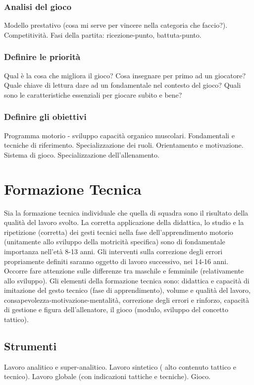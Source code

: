 \subsubsection{Analisi del gioco}
Modello prestativo (cosa mi serve per vincere nella categoria che faccio?).
Competitività.
Fasi della partita: ricezione-punto, battuta-punto.

\subsubsection{Definire le priorità}
Qual è la cosa che migliora il gioco? Cosa insegnare per primo ad un giocatore? Quale chiave di lettura dare ad un fondamentale nel contesto del gioco? Quali sono le caratteristiche essenziali per giocare subito e bene?

\subsubsection{Definire gli obiettivi}
Programma motorio - sviluppo capacità organico muscolari.
Fondamentali e tecniche di riferimento.
Specializzazione dei ruoli.
Orientamento e motivazione.
Sistema di gioco.
Specializzazione dell'allenamento.

\section{Formazione Tecnica}
Sia la formazione tecnica individuale che quella di squadra sono il risultato della qualità del lavoro svolto. La corretta applicazione della didattica, lo studio e la ripetizione (corretta) dei gesti tecnici nella fase dell'apprendimento motorio (unitamente allo sviluppo della motricità specifica) sono di fondamentale importanza nell'età 8-13 anni.
Gli interventi sulla correzione degli errori propriamente definiti saranno oggetto di lavoro successivo, nei 14-16 anni.
Occorre fare attenzione sulle differenze tra maschile e femminile (relativamente allo sviluppo).
Gli elementi della formazione tecnica sono: didattica e capacità di imitazione del gesto tecnico (fase di apprendimento), volume e qualità del lavoro,  consapevolezza-motivazione-mentalità, correzione degli errori e rinforzo, capacità di gestione e figura dell'allenatore, il gioco (modulo, sviluppo del concetto tattico).


\subsection{Strumenti}
Lavoro analitico e super-analitico.
Lavoro sintetico ( alto contenuto tattico e tecnico).
Lavoro globale (con indicazioni tattiche e tecniche).
Gioco.

